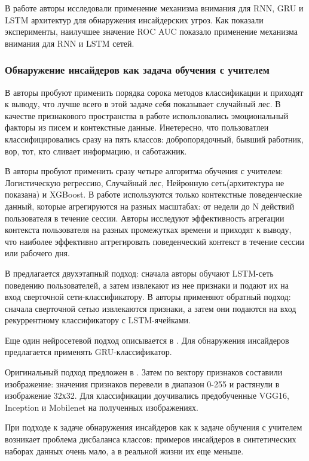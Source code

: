 В работе \cite{attention} авторы исследовали применение механизма внимания для RNN, GRU и LSTM архитектур для обнаружения инсайдерских угроз. Как показали эксперименты, наилучшее значение ROC AUC показало применение механизма внимания для RNN и LSTM сетей.


\subsubsection{Обнаружение инсайдеров как задача обучения с учителем}

В \cite{suites} авторы пробуют применить порядка сорока методов классификации и приходят к выводу, что лучше всего в этой задаче себя показывает случайный лес. В качестве признакового пространства в работе использовались эмоциональный факторы из писем и контекстные данные. Инетересно, что пользоватлеи классифицировались сразу на пять классов: добропорядочный, бывший работник, вор, тот, кто сливает информацию, и саботажник.

В \cite{granual} авторы пробуют применить сразу четыре алгоритма обучения с учителем: Логистическую регрессию, Случайный лес, Нейронную сеть(архитектура не показана) и XGBoost. В работе используются только контекстные поведенческие данный, которые агрегируются на разных масштабах: от недели до N действий пользователя в течение сессии. Авторы исследуют эффективность агрегации контекста пользователя на разных промежутках времени и приходят к выводу, что наиболее эффективно аггрегировать поведенческий контекст в течение сессии или рабочего дня.

В \cite{lstm_cnn} предлагается двухэтапный подход: сначала авторы обучают LSTM-сеть поведению пользователей, а затем извлекают из нее признаки и подают их на вход сверточной сети-классификатору.
В \cite{cnn_lstm} авторы применяют обратный подход: сначала сверточной сетью извлекаются признаки, а затем они подаются на вход рекуррентному классификатору с LSTM-ячейками. 

Еще один нейросетевой подход описывается в \cite{gru}. Для обнаружения инсайдеров предлагается применять GRU-классификатор.

Оригинальный подход предложен в \cite{imagebased}. Затем по вектору признаков составили изображение: значения признаков перевели в диапазон 0-255 и растянули в изображение 32х32. Для классификации доучивались предобученные VGG16, Inception и Mobilenet на полученных изображениях.

При подходе к задаче обнаружения инсайдеров как к задаче обучения с учителем возникает проблема дисбаланса классов: примеров инсайдеров в синтетических наборах данных очень мало, а в реальной жизни их еще меньше.

